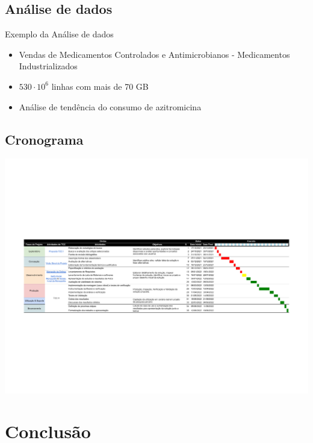\documentclass[10pt,brazil]{beamer}
\theoremstyle{definition}
\begin{document}
\subsection{Análise de dados}

\begin{frame}{Exemplo da Análise de dados}
  \begin{itemize}
    \item Vendas de Medicamentos Controlados e Antimicrobianos - Medicamentos Industrializados
    \item $530 \cdot 10^{6}$ linhas com mais de 70 GB
    \item Análise de tendência do consumo de azitromicina
  \end{itemize}
\end{frame}

\subsection{Cronograma}

\begin{frame}[plain]
  \hspace*{-10mm}
  \includegraphics[width=\paperwidth]{TCC cronograma - Sheet1.pdf}
\end{frame}

\section{Conclusão}
\end{document}
